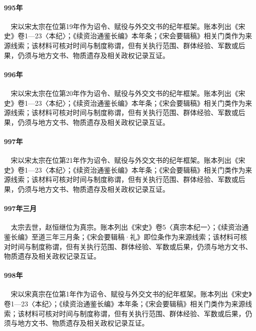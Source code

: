 \paragraph{995年}　宋以宋太宗在位第19年作为诏令、赋役与外交文书的纪年框架。账本列出《宋史》卷1—23〈本纪〉；《续资治通鉴长编》本年条；《宋会要辑稿》相关门类作为来源线索；该材料可核对时间与制度称谓，但有关执行范围、群体经验、军数或后果，仍须与地方文书、物质遗存及相关政权记录互证。

\paragraph{996年}　宋以宋太宗在位第20年作为诏令、赋役与外交文书的纪年框架。账本列出《宋史》卷1—23〈本纪〉；《续资治通鉴长编》本年条；《宋会要辑稿》相关门类作为来源线索；该材料可核对时间与制度称谓，但有关执行范围、群体经验、军数或后果，仍须与地方文书、物质遗存及相关政权记录互证。

\paragraph{997年}　宋以宋太宗在位第21年作为诏令、赋役与外交文书的纪年框架。账本列出《宋史》卷1—23〈本纪〉；《续资治通鉴长编》本年条；《宋会要辑稿》相关门类作为来源线索；该材料可核对时间与制度称谓，但有关执行范围、群体经验、军数或后果，仍须与地方文书、物质遗存及相关政权记录互证。

\paragraph{997年三月}　太宗去世，赵恒继位为真宗。账本列出《宋史》卷5〈真宗本纪一〉；《续资治通鉴长编》至道三年三月条；《宋会要辑稿·礼》即位条作为来源线索；该材料可核对时间与制度称谓，但有关执行范围、群体经验、军数或后果，仍须与地方文书、物质遗存及相关政权记录互证。

\paragraph{998年}　宋以宋真宗在位第1年作为诏令、赋役与外交文书的纪年框架。账本列出《宋史》卷1—23〈本纪〉；《续资治通鉴长编》本年条；《宋会要辑稿》相关门类作为来源线索；该材料可核对时间与制度称谓，但有关执行范围、群体经验、军数或后果，仍须与地方文书、物质遗存及相关政权记录互证。

